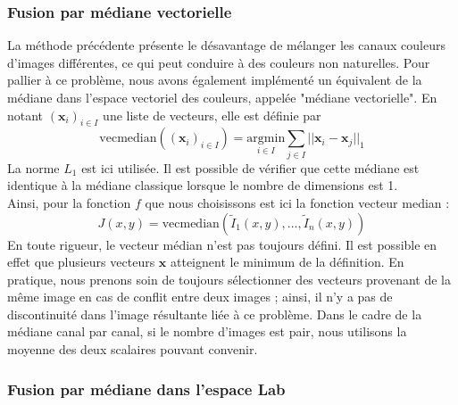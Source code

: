 \documentclass[12pt,a4paper]{article}
\begin{document}
\subsubsection{Fusion par médiane vectorielle}
\label{fusiontruemediane}
La méthode précédente présente le désavantage de mélanger les canaux couleurs d'images différentes, ce qui peut conduire à des couleurs non naturelles. Pour pallier à ce problème, nous avons également implémenté un équivalent de la médiane dans l'espace vectoriel des couleurs, appelée "médiane vectorielle". En notant $(\mathbf{x}_i)_{i \in I}$ une liste de vecteurs, elle est définie par
\[
\mathrm{vecmedian}\left((\mathbf{x}_i)_{i \in I}\right) = \underset{i \in I}{\mathrm{argmin}} \sum_{j \in I} ||\mathbf{x}_i-\mathbf{x}_j||_1
\]
La norme $L_1$ est ici utilisée. Il est possible de vérifier que cette médiane est identique à la médiane classique lorsque le nombre de dimensions est 1. \\
Ainsi, pour la fonction $f$ que nous choisissons est ici la fonction vecteur median :
\[
J(x,y)=\mathrm{vecmedian}\left(\tilde I_1(x,y), ..., \tilde I_n(x,y)\right)
\]
En toute rigueur, le vecteur médian n'est pas toujours défini. Il est possible en effet que plusieurs vecteurs $\mathbf{x}$ atteignent le minimum de la définition. En pratique, nous prenons soin de toujours sélectionner des vecteurs provenant de la même image en cas de conflit entre deux images ; ainsi, il n'y a pas de discontinuité dans l'image résultante liée à ce problème. Dans le cadre de la médiane canal par canal, si le nombre d'images est pair, nous utilisons la moyenne des deux scalaires pouvant convenir.
\subsubsection{Fusion par médiane dans l'espace Lab}
\label{fusionlab}
\end{document}

